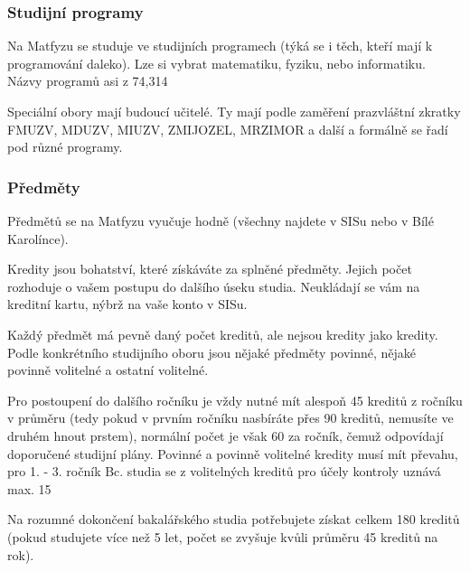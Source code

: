 \subsubsection{Studijní programy}
Na Matfyzu se studuje ve studijních programech (týká se i těch, kteří mají k programování daleko). Lze si vybrat matematiku, fyziku, nebo informatiku. Názvy programů asi z 74,314 %

Speciální obory mají budoucí učitelé. Ty mají podle zaměření prazvláštní zkratky FMUZV, MDUZV, MIUZV, ZMIJOZEL, MRZIMOR a další a formálně se řadí pod různé programy.



\subsubsection{Předměty}
Předmětů se na Matfyzu vyučuje hodně (všechny najdete v SISu nebo v Bílé Karolínce).


Kredity jsou bohatství, které získáváte za splněné předměty. Jejich počet rozhoduje o vašem postupu do dalšího úseku studia. Neukládají se vám na kreditní kartu, nýbrž na vaše konto v SISu.

Každý předmět má pevně daný počet kreditů, ale nejsou kredity jako kredity. Podle konkrétního studijního oboru jsou nějaké předměty povinné, nějaké povinně volitelné a ostatní volitelné.

Pro postoupení do dalšího ročníku je vždy nutné mít alespoň 45 kreditů z ročníku v průměru (tedy pokud v prvním ročníku nasbíráte přes 90 kreditů, nemusíte ve druhém hnout prstem), normální počet je však 60 za ročník, čemuž odpovídají doporučené studijní plány. Povinné a povinně volitelné kredity musí mít převahu, pro 1. - 3. ročník Bc. studia se z volitelných kreditů pro účely kontroly uznává max. 15 %

Na rozumné dokončení bakalářského studia potřebujete získat celkem 180 kreditů (pokud studujete více než 5 let, počet se zvyšuje kvůli průměru 45 kreditů na rok).

